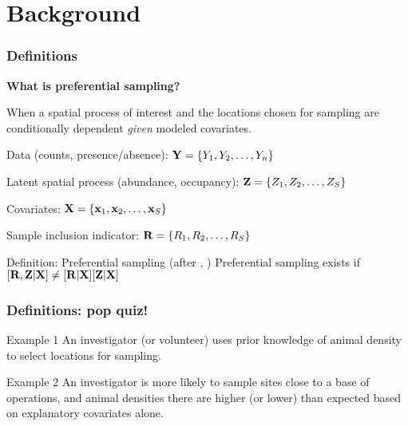 \documentclass[serif,mathserif]{beamer}
\begin{document}
\section{Background} %
\begin{frame}
\frametitle{Definitions}
  \textcolor{noaaturq}{\textbf{What is preferential sampling?}} \\ \pause

  When a spatial process of interest and the locations chosen for sampling are conditionally dependent \textit{given} modeled covariates. \pause

\vspace{0.5cm}

\textcolor{noaaturq}{Data} (counts, presence/absence): ${\bf Y} = \{ Y_1, Y_2, \hdots, Y_n \}$ \pause

\vspace{0.25cm}

\textcolor{noaaturq}{Latent spatial process} (abundance, occupancy): ${\bf Z} = \{ Z_1, Z_2, \hdots, Z_S \}$ \pause

\vspace{0.25cm}

\textcolor{noaaturq}{Covariates}: ${\bf X} = \{ {\bf x}_1, {\bf x}_2, \hdots, {\bf x}_S \}$ \pause

\vspace{0.25cm}

\textcolor{noaaturq}{Sample inclusion indicator}: ${\bf R} = \{ R_1, R_2, \hdots, R_S \}$ \pause

\begin{block}{Definition: Preferential sampling (after \citet{DiggleEtAl2010}, \citet{PatiEtAl2011})}
      Preferential sampling exists if $[{\bf R},{\bf Z} | {\bf X}] \neq [{\bf R}|{\bf X}][{\bf Z}|{\bf X}]$
\end{block}
\end{frame}



\begin{frame}
  \frametitle{Definitions: pop quiz!}
  \vspace{0.75cm}

  \textcolor{noaaturq}{Example 1} An investigator (or volunteer) uses prior knowledge of animal density to select locations for sampling. \\ \pause

  \vspace{0.5cm}

  \textcolor{noaaturq}{Example 2} An investigator is more likely to sample sites close to a base of operations, and animal densities there are higher (or lower) than expected based on explanatory covariates alone.

\end{frame}
\end{document}
